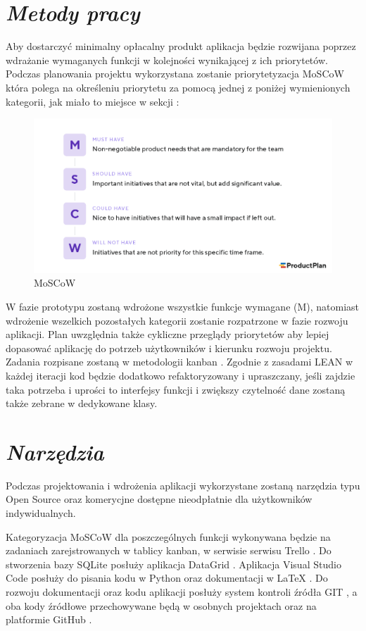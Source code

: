 \documentclass[a4paper,10pt, twoside]{report}
\newcommand{\customstylesection}[1]{\textbf{\textit{#1}}}
\begin{document}
\section{\customstylesection{Metody pracy}}
{Aby dostarczyć minimalny opłacalny produkt \cite{MVP} aplikacja będzie 
rozwijana poprzez wdrażanie wymaganych funkcji w kolejności wynikającej 
z ich priorytetów. Podczas planowania projektu wykorzystana zostanie 
priorytetyzacja MoSCoW \cite{MOSCOW} która polega na określeniu priorytetu za 
pomocą jednej z poniżej wymienionych kategorii, jak miało to miejsce w sekcji 
:
\begin{figure}[H]           %
    \caption{MoSCoW}
    \label{fig:MoSCoW}
    \centering  
    \includegraphics[width=12cm]{figures/MoSCoW-01.png}
\end{figure}
W fazie prototypu zostaną wdrożone wszystkie funkcje wymagane (M), 
natomiast wdrożenie wszelkich pozostałych kategorii zostanie rozpatrzone w fazie
 rozwoju aplikacji. Plan uwzględnia także cykliczne przeglądy priorytetów aby 
 lepiej dopasować aplikację do potrzeb użytkowników i kierunku rozwoju projektu.
 Zadania rozpisane zostaną w metodologii kanban \cite{Kanban}. Zgodnie z 
zasadami LEAN \cite{LEAN} w każdej iteracji kod będzie dodatkowo refaktoryzowany
 i upraszczany, jeśli zajdzie taka potrzeba i uprości to interfejsy funkcji i 
zwiększy czytelność dane zostaną także zebrane w dedykowane klasy.}

\section{\customstylesection{Narzędzia}}
{Podczas projektowania i wdrożenia aplikacji wykorzystane zostaną narzędzia typu
 Open Source oraz komerycjne dostępne nieodpłatnie dla użytkowników 
indywidualnych.}

{Kategoryzacja MoSCoW \cite{MOSCOW} dla poszczególnych funkcji wykonywana będzie
 na zadaniach zarejstrowanych w tablicy kanban, w serwisie serwisu Trello 
\cite{Trello}. Do stworzenia bazy SQLite \cite{SQLite} posłuży aplikacja 
DataGrid \cite{DataGrid}. Aplikacja Visual Studio Code \cite{VSCode} posłuży do
 pisania kodu w Python \cite{Python} oraz dokumentacji w LaTeX \cite{LaTeX}. Do 
rozwoju dokumentacji oraz kodu aplikacji posłuży system kontroli źródła GIT 
\cite{GIT}, a oba kody źródłowe przechowywane będą w osobnych projektach 
\cite[DatabaseShenanigans]{GITBudgeterApp} oraz \cite[budgeter]{GITBudgeterDoc}
 na platformie GitHub \cite{GitHub}.}
\end{document}
